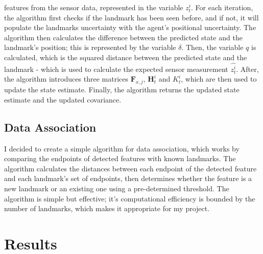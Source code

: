 \documentclass[12pt]{article}
\begin{document}
features from the sensor data, represented in the variable \(z^i_t\). For each iteration, the algorithm first checks if the landmark has been
seen before, and if not, it will populate the landmarks uncertainty with the agent's positional uncertainty. The algorithm then calculates
the difference between the predicted state and the landmark's position; this is represented by the variable \(\delta\). Then, the variable
\(q\) is calculated, which is the squared distance between the predicted state and the landmark - which is used to calculate the expected
sensor measurement \(\hat{z^i_t}\). After, the algorithm introduces three matrices \(\mathbf{F}_{x,j}\), \(\mathbf{H}_t^i\) and \(K_t^i\), which
are then used to update the state estimate. Finally, the algorithm returns the updated state estimate and the updated covariance.\\

\subsection{Data Association}
I decided to create a simple algorithm for data association, which works by comparing the endpoints of detected features with known
landmarks. The algorithm calculates the distances between each endpoint of the detected feature and each landmark's set of endpoints,
then determines whether the feature is a new landmark or an existing one using a pre-determined threshold. The algorithm is simple
but effective; it's computational efficiency is bounded by the number of landmarks, which makes it appropriate for my project.\\

\newpage

\section{Results}
\end{document}
